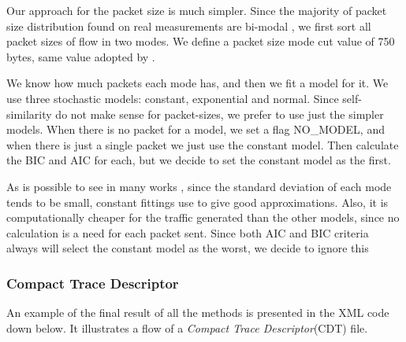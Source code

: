 Our approach for the packet size is much simpler. Since the majority of packet size distribution found on real measurements are bi-modal \cite{packet-distribution-model}\cite{sourcesonoff-paper}\cite{udp-flows-model}, we first sort all packet sizes of flow in two modes. We define a packet size mode cut value of 750 bytes, same value adopted by \cite{udp-flows-model}. 

We know how much packets each mode has, and then we fit a model for it. We use three stochastic models: constant, exponential and normal. Since self-similarity do not make sense for packet-sizes, we prefer to use just the simpler models. When there is no packet for a model, we set a flag NO\_MODEL, and when there is just a single packet we just use the constant model. Then calculate the BIC and AIC for each, but we decide to set the constant model as the first.

As is possible to see in many works \cite{packet-distribution-model} \cite{udp-flows-model}, since the standard deviation of each mode tends to be small, constant fittings use to give good approximations. Also, it is computationally cheaper for the traffic generated than the other models, since no calculation is a need for each packet sent. Since both AIC and BIC criteria always will select the constant model as the worst, we decide to ignore this

\subsubsection{Compact Trace Descriptor}

An example of the final result of all the methods is presented in the XML code down below. It illustrates a flow of a \textit{Compact Trace Descriptor}(CDT) file.

